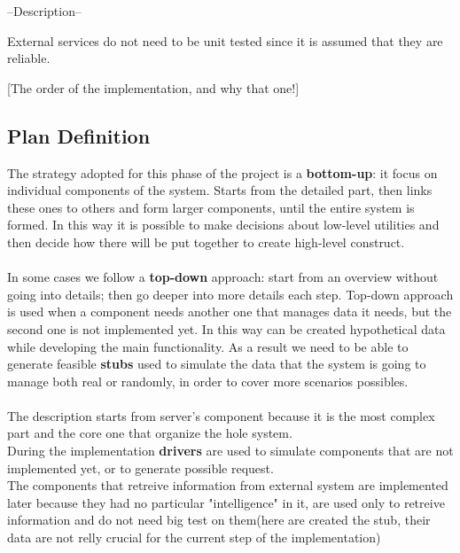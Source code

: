 --Description--

External services do not need to be unit tested since it is assumed that they are reliable. 

[The order of the implementation, and why that one!]


\subsection{Plan Definition}
The strategy adopted for this phase of the project is a \textbf{bottom-up}: it focus on individual components of the system. Starts from the detailed part, then links these ones to others and form larger components, until the entire system is formed. In this way it is possible to make decisions about low-level utilities and then decide how there will be put together to create high-level construct.\\ \\
In some cases we follow a \textbf{top-down} approach: start from an overview without going into details; then go deeper into more details each step. Top-down approach is used when a component needs another one that manages data it needs, but the second one is not implemented yet. In this way can be created hypothetical data while developing the main functionality. As a result we need to be able to generate feasible \textbf{stubs} used to simulate the data that the system is going to manage both real or randomly, in order to cover more scenarios possibles.\\ \\
The description starts from server's component because it is the most complex part and the core one that organize the hole system.\\
During the implementation \textbf{drivers} are used to simulate components that are not implemented yet, or to generate possible request.\\
The components that retreive information from external system are implemented later because they had no particular "intelligence" in it, are used only to retreive information and do not need big test on them(here are created the stub, their data are not relly crucial for the current step of the implementation) 


